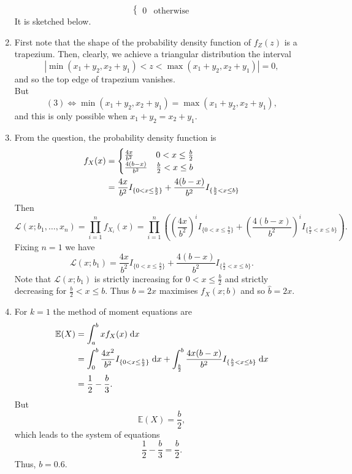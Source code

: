 \documentclass{article}
\begin{document}
\begin{enumerate}
\[\begin{cases}
    0 & \text{otherwise}
  \end{cases}\]
  It is sketched below.\newpage
  \item First note that the shape of the probability density function of $f_Z(z)$ is a trapezium. Then, clearly, we achieve a triangular distribution the interval \[|\min(x_1+y_2, x_2+y_1) < z < \max(x_1+y_2, x_2+y_1)| = 0, \tag{3}\]and so the top edge of trapezium vanishes.\\[1\baselineskip]
  But \[(3) \Longleftrightarrow \min(x_1+y_2, x_2+y_1) = \max(x_1+y_2, x_2+y_1),\] and this is only possible when $x_1 + y_2 = x_2 + y_1$.
  \item From the question, the probability density function is \begin{align}
    f_X(x) &= \begin{cases}\frac{4x}{b^2} & 0 < x \leq \frac{b}{2} \\ \frac{4(b-x)}{b^2} & \frac{b}{2} < x \leq b \end{cases} \notag \\
    &= \frac{4x}{b^2}I_{\{0<x\leq\frac{b}{2}\}} + \frac{4(b-x)}{b^2}I_{\{\frac{b}{2} < x \leq b\}} \notag
  \end{align}
  Then
  \[\mathcal{L}(x; b_1, \ldots, x_n) = \prod_{i=1}^n f_{X_i}(x) = \prod_{i=1}^n \left(\left(\frac{4x}{b^2}\right)^i I_{\{0 < x \leq \frac{b}{2}\}} + \left(\frac{4(b-x)}{b^2}\right)^iI_{\{\frac{b}{2} < x \leq b\}}\right).\]
  Fixing $n = 1$ we have \[\mathcal{L}(x; b_1) = \frac{4x}{b^2}I_{\{0<x\leq\frac{b}{2}\}} + \frac{4(b-x)}{b^2}I_{\{\frac{b}{2} < x \leq b\}}.\]
  Note that $\mathcal{L}(x; b_1)$ is strictly increasing for $0 < x \leq \frac{b}{2}$ and strictly decreasing for $\frac{b}{2} < x \leq b$. Thus $b = 2x$ maximises $f_X(x; b)$ and so $\hat{b} = 2x$.  
  \item For $k = 1$ the method of moment equations are \begin{align}
    \mathbb{E}(X) &= \int_a^b x f_X(x) \; \mathrm{d}x \notag \\
    &= \int_0^b \frac{4x^2}{b^2}I_{\{0<x\leq\frac{b}{2}\}} \; \mathrm{d}x + \int_\frac{b}{2}^b \frac{4x(b-x)}{b^2}I_{\{\frac{b}{2} < x \leq b\}} \; \mathrm{d}x \notag \\
    &= \frac{1}{2} -\frac{b}{3}. \notag
  \end{align}
  But \[\mathbb{E}(X) = \frac{b}{2},\]which leads to the system of equations \[\frac{1}{2} - \frac{b}{3} = \frac{b}{2}.\]Thus, $b = 0.6$.
\end{enumerate}
\end{document}
